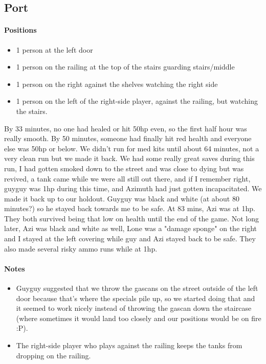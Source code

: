 \subsection{Port}
\paragraph{Positions}
\begin{itemize}
\item 1 person at the left door
\item 1 person on the railing at the top of the stairs guarding stairs/middle
\item 1 person on the right against the shelves watching the right side
\item 1 person on the left of the right-side player, against the railing, but watching the stairs.
\end{itemize}

By 33 minutes, no one had healed or hit 50hp even, so the first half hour was really smooth. By 50 minutes, someone had finally hit red health and everyone else was 50hp or below. We didn't run for med kits until about 64 minutes, not a very clean run but we made it back. We had some really great saves during this run, I had gotten smoked down to the street and was close to dying but was revived, a tank came while we were all still out there, and if I remember right, guyguy was 1hp during this time, and Azimuth had just gotten incapacitated. We made it back up to our holdout. Guyguy was black and white (at about 80 minutes?) so he stayed back towards me to be safe. At 83 mins, Azi was at 1hp. They both survived being that low on health until the end of the game. Not long later, Azi was black and white as well, Lone was a "damage sponge" on the right and I stayed at the left covering while guy and Azi stayed back to be safe. They also made several risky ammo runs while at 1hp. 

\paragraph{Notes}
\begin{itemize}
\item Guyguy suggested that we throw the gascans on the street outside of the left door because that's where the specials pile up, so we started doing that and it seemed to work nicely instead of throwing the gascan down the staircase (where sometimes it would land too closely and our positions would be on fire :P). 
\item The right-side player who plays against the railing keeps the tanks from dropping on the railing.
\end{itemize}

